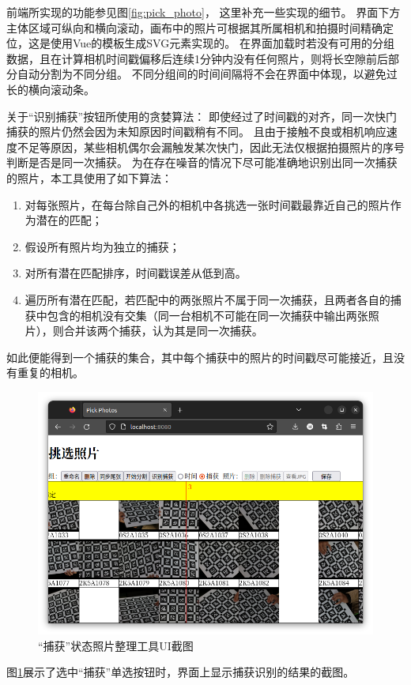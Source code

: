 前端所实现的功能参见图\ref{fig:pick_photo}，
这里补充一些实现的细节。
界面下方主体区域可纵向和横向滚动，画布中的照片可根据其所属相机和拍摄时间精确定位，这是使用Vue的模板生成SVG元素实现的。
在界面加载时若没有可用的分组数据，且在计算相机时间戳偏移后连续1分钟内没有任何照片，则将长空隙前后部分自动分割为不同分组。
不同分组间的时间间隔将不会在界面中体现，以避免过长的横向滚动条。

关于“识别捕获”按钮所使用的贪婪算法：
即使经过了时间戳的对齐，同一次快门捕获的照片仍然会因为未知原因时间戳稍有不同。
且由于接触不良或相机响应速度不足等原因，某些相机偶尔会漏触发某次快门，因此无法仅根据拍摄照片的序号判断是否是同一次捕获。
为在存在噪音的情况下尽可能准确地识别出同一次捕获的照片，本工具使用了如下算法：
\begin{enumerate}
\item 对每张照片，在每台除自己外的相机中各挑选一张时间戳最靠近自己的照片作为潜在的匹配；
\item 假设所有照片均为独立的捕获；
\item 对所有潜在匹配排序，时间戳误差从低到高。
\item 遍历所有潜在匹配，若匹配中的两张照片不属于同一次捕获，且两者各自的捕获中包含的相机没有交集（同一台相机不可能在同一次捕获中输出两张照片），则合并该两个捕获，认为其是同一次捕获。
\end{enumerate}
如此便能得到一个捕获的集合，其中每个捕获中的照片的时间戳尽可能接近，且没有重复的相机。
\begin{figure}
\includegraphics[width=\textwidth,trim={10 10 10 120},clip]{figures/pick_photo_capture}
\caption{“捕获”状态照片整理工具UI截图}
\label{fig:pick_photo_capture}
\end{figure}
图\ref{fig:pick_photo_capture}展示了选中“捕获”单选按钮时，界面上显示捕获识别的结果的截图。
